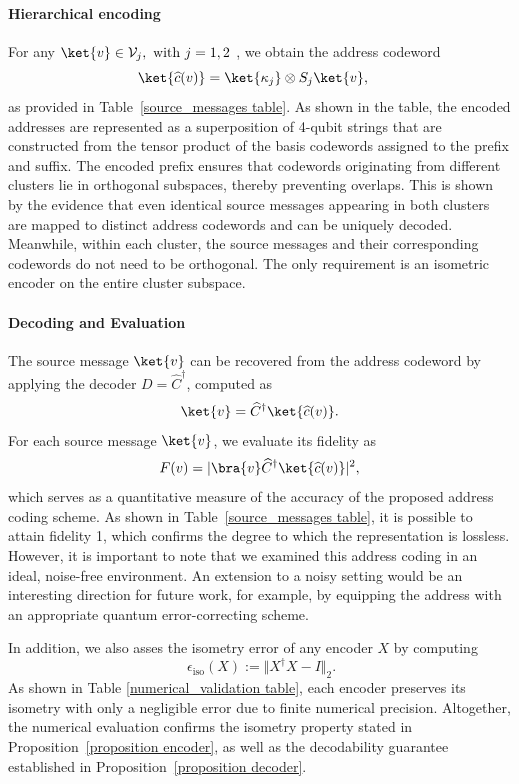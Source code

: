 \documentclass[conference]{IEEEtran}
\begin{document}
\paragraph{Hierarchical encoding}
For any \(\ket{v}\in\mathcal V_j, \text{ with } j=1,2\) , we  obtain the address codeword
\[
\ket{\widehat c(v)}=\ket{\kappa_j}\otimes S_j\ket{v},
\quad 
\]
as provided in Table~\ref{source_messages table}. %
As shown in the table, the encoded addresses are represented as a superposition of 4-qubit strings that are constructed from the tensor product of the basis codewords assigned to the prefix and suffix. The encoded prefix ensures that codewords originating from different clusters lie in orthogonal subspaces, thereby preventing overlaps. This is shown by the evidence that even identical source messages appearing in both clusters are mapped to distinct address codewords and can be uniquely decoded. Meanwhile, within each cluster, the source messages and their corresponding codewords do not need to be orthogonal. The only requirement is an isometric encoder on the entire cluster subspace.

\paragraph{Decoding and Evaluation}
The source message $\ket{v}$ can be recovered from the address codeword by applying the decoder $D=\widehat C^\dagger$, computed as
\[\ket{v}=\widehat C^\dagger\ket{\widehat c(v)}.\] For each source message $\ket{v}$, we evaluate its fidelity  as
\[
F(v) =  \vert\bra{v}\widehat{C}^\dagger \ket{\widehat{c}(v)}\vert^2,
\]
which serves as a quantitative measure of the accuracy of the proposed address coding scheme. As shown in Table~\ref{source_messages table}, it is possible to attain fidelity 1, which confirms the degree to which the representation is lossless. %
However, it is important to note that we examined this address coding in an ideal, noise-free environment. An extension to a noisy setting would be an interesting direction for future work, for example, by equipping the address with an appropriate quantum error-correcting scheme. 

In addition, we also asses the isometry error of any encoder $X$ by computing
\[\
\epsilon_{\mathrm{iso}}(X):=\Vert X^\dagger X - I\Vert_2.
\]
As shown in Table \ref{numerical_validation table}, each encoder preserves its isometry with only a negligible error due to finite numerical precision. Altogether, the numerical evaluation confirms the isometry property stated in Proposition~\ref{proposition encoder}, as well as the decodability guarantee established in Proposition~\ref{proposition decoder}.
\end{document}
